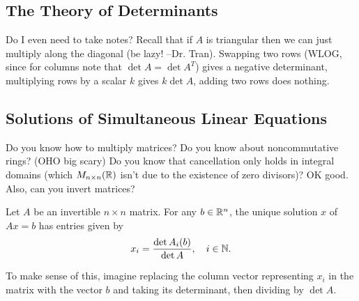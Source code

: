 \subsection{The Theory of Determinants}
Do I even need to take notes? Recall that if $A$ is triangular then we can just multiply along the diagonal (be lazy! –Dr. Tran). Swapping two rows (WLOG, since for columns note that $\det A= \det A^T$) gives a negative determinant, multiplying rows by a scalar $k$ gives $k\det A$, adding two rows does nothing.

\subsection{Solutions of Simultaneous Linear Equations}
Do you know how to multiply matrices? Do you know about noncommutative rings? (OHO big scary) Do you know that cancellation only holds in integral domains (which $M_{n\times n}(\mathbb{R})$ isn't due to the existence of zero divisors)? OK good. Also, can you invert matrices?
\begin{theorem}
   Let $A$ be an invertible $n\times n$ matrix. For any $b\in \mathbb{R}^n $, the unique solution $x$ of $Ax=b$ has entries given by \[
       x_i =\frac{\det A_i (b)}{\det A},\quad i\in \mathbb{N}.
   \] 
\end{theorem}
To make sense of this, imagine replacing the column vector representing $x_i $ in the matrix with the vector $b$ and taking its determinant, then dividing by $\det A$.

